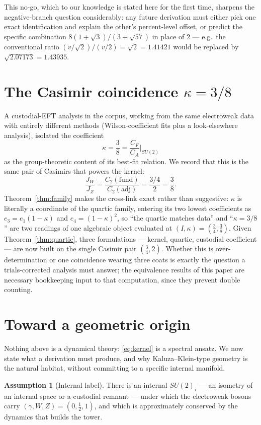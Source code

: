 \documentclass[11pt,a4paper]{article}
\theoremstyle{definition}
\newtheorem{assumption}{Assumption}
\begin{document}
This no-go, which to our knowledge is stated here for the first time,
sharpens the negative-branch question considerably: any future derivation
must either pick one exact identification and explain the other's
percent-level offset, or predict the specific combination
$8(1+\sqrt3)/(3+\sqrt{57})$ in place of $2$ --- e.g.\ the conventional
ratio $(v/\sqrt2)/(v/2)=\sqrt2=1.41421$ would be replaced by
$\sqrt{2.07173}=1.43935$.

\section{The Casimir coincidence \texorpdfstring{$\kappa=3/8$}{k=3/8}}
\label{sec:casimir}

A custodial-EFT analysis in the corpus, working from the same electroweak
data with entirely different methods (Wilson-coefficient fits plus a
look-elsewhere analysis), isolated the coefficient
\[
\kappa=\frac38=\frac{C_F}{C_A}\Big|_{SU(2)}
\]
as the group-theoretic content of its best-fit relation. We record that
this is the same pair of Casimirs that powers the kernel:
\[
\frac{J_W}{J_Z}=\frac{C_2(\text{fund})}{C_2(\text{adj})}
=\frac{3/4}{2}=\frac38 .
\]
Theorem~\ref{thm:family} makes the cross-link exact rather than
suggestive: $\kappa$ is literally a coordinate of the quartic family,
entering its two lowest coefficients as $e_3=e_1(1-\kappa)$ and
$e_4=(1-\kappa)^2$, so ``the quartic matches data'' and ``$\kappa=3/8$''
are two readings of one algebraic object evaluated at
$(I,\kappa)=(\tfrac34,\tfrac38)$. Given Theorem~\ref{thm:quartic}, three
formulations --- kernel, quartic, custodial coefficient --- are now built
on the single Casimir pair $(\tfrac34,2)$. Whether this is
over-determination or one coincidence wearing three coats is exactly the
question a trials-corrected analysis must answer; the equivalence results
of this paper are necessary bookkeeping input to that computation, since
they prevent double counting.

\section{Toward a geometric origin}
\label{sec:geometry}

Nothing above is a dynamical theory: \eqref{eq:kernel} is a spectral
ansatz. We now state what a derivation must produce, and why
Kaluza--Klein-type geometry is the natural habitat, without committing to a
specific internal manifold.

\begin{assumption}[Internal label]
\label{ass:su2i}
There is an internal $SU(2)_i$ --- an isometry of an internal space or a
custodial remnant --- under which the electroweak bosons carry
$(\gamma,W,Z)=(0,\tfrac12,1)$, and which is approximately conserved by the
dynamics that builds the tower.
\end{assumption}
\end{document}
